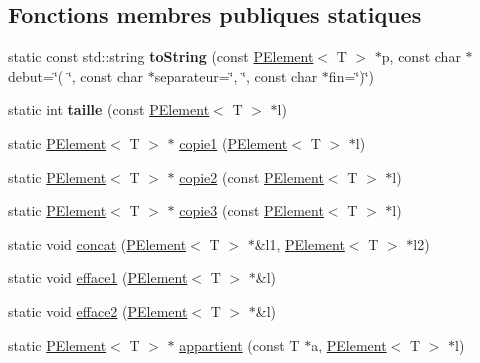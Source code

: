 \subsection*{Fonctions membres publiques statiques}
\begin{DoxyCompactItemize}
\item 
\mbox{\label{class_p_element_adcb7faf10cd11d48fa2b5e91d247cd49}} 
static const std\+::string {\bfseries to\+String} (const \mbox{\hyperlink{class_p_element}{P\+Element}}$<$ T $>$ $\ast$p, const char $\ast$debut=\char`\"{}( \char`\"{}, const char $\ast$separateur=\char`\"{}, \char`\"{}, const char $\ast$fin=\char`\"{})\char`\"{})
\item 
\mbox{\label{class_p_element_a235499efd4e563d1fe59e4c804832d9c}} 
static int {\bfseries taille} (const \mbox{\hyperlink{class_p_element}{P\+Element}}$<$ T $>$ $\ast$l)
\item 
static \mbox{\hyperlink{class_p_element}{P\+Element}}$<$ T $>$ $\ast$ \mbox{\hyperlink{class_p_element_a37f4263271bae1cd966909f6aecc257d}{copie1}} (\mbox{\hyperlink{class_p_element}{P\+Element}}$<$ T $>$ $\ast$l)
\item 
static \mbox{\hyperlink{class_p_element}{P\+Element}}$<$ T $>$ $\ast$ \mbox{\hyperlink{class_p_element_ace62f81f477d335fb2ff62d0992ebc6d}{copie2}} (const \mbox{\hyperlink{class_p_element}{P\+Element}}$<$ T $>$ $\ast$l)
\item 
static \mbox{\hyperlink{class_p_element}{P\+Element}}$<$ T $>$ $\ast$ \mbox{\hyperlink{class_p_element_afb475b1a17065198ee133b268f4cfc2a}{copie3}} (const \mbox{\hyperlink{class_p_element}{P\+Element}}$<$ T $>$ $\ast$l)
\item 
static void \mbox{\hyperlink{class_p_element_ad481033d278200374e19cc3f2f8df0c7}{concat}} (\mbox{\hyperlink{class_p_element}{P\+Element}}$<$ T $>$ $\ast$\&l1, \mbox{\hyperlink{class_p_element}{P\+Element}}$<$ T $>$ $\ast$l2)
\item 
static void \mbox{\hyperlink{class_p_element_abd2e6b05692413616650fcd953317324}{efface1}} (\mbox{\hyperlink{class_p_element}{P\+Element}}$<$ T $>$ $\ast$\&l)
\item 
static void \mbox{\hyperlink{class_p_element_a9e377727c7c78db9f49a7dde2ead74cd}{efface2}} (\mbox{\hyperlink{class_p_element}{P\+Element}}$<$ T $>$ $\ast$\&l)
\item 
static \mbox{\hyperlink{class_p_element}{P\+Element}}$<$ T $>$ $\ast$ \mbox{\hyperlink{class_p_element_aee7ccc9dcc49558af92960dd60fafc9d}{appartient}} (const T $\ast$a, \mbox{\hyperlink{class_p_element}{P\+Element}}$<$ T $>$ $\ast$l)

\end{DoxyCompactItemize}
